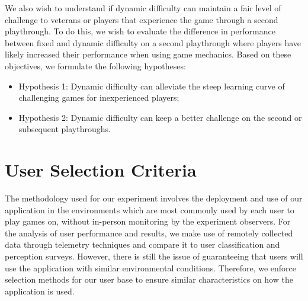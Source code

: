 We also wish to understand if dynamic difficulty can maintain a fair level of challenge to veterans or players that experience the game through a second playthrough. To do this, we wish to evaluate the difference in performance between fixed and dynamic difficulty on a second playthrough where players have likely increased their performance when using game mechanics. Based on these objectives, we formulate the following hypotheses:
\begin{itemize}
    \item{Hypothesis 1: Dynamic difficulty can alleviate the steep learning curve of challenging games for inexperienced players;}
    \item{Hypothesis 2: Dynamic difficulty can keep a better challenge on the second or subsequent playthroughs.}
\end{itemize}





\section{User Selection Criteria}


The methodology used for our experiment involves the deployment and use of our application in the environments which are most commonly used by each user to play games on, without in-person monitoring by the experiment observers. For the analysis of user performance and results, we make use of remotely collected data through telemetry techniques and compare it to user classification and perception surveys. However, there is still the issue of guaranteeing that users will use the application with similar environmental conditions. Therefore, we enforce selection methods for our user base to ensure similar characteristics on how the application is used.

